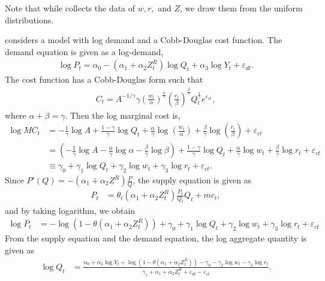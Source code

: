 \documentclass[11pt, a4paper]{article}
\begin{document}
Note that while \citet{hyde1995can} collects the data of $w, r,$ and $Z$, we draw them from the uniform distributions. 


\citet{hyde1995can} considers a model with log demand and a Cobb-Douglas cost function. 
The demand equation is given as a log-demand, 
\begin{align}
    \log P_{t} = \alpha_0 - (\alpha_1 + \alpha_2 Z^R_t) \log Q_t + \alpha_3 \log Y_t + \varepsilon_{dt}.
\end{align}
The cost function has a Cobb-Douglas form such that 
\begin{align}
    C_t = A^{-1/\gamma} \gamma \left(\frac{w_t}{\alpha}\right)^{\frac{\alpha}{\gamma}} \left(\frac{r_t}{\beta}\right)^{\frac{\beta}{\gamma}} Q_t^{\frac{1}{\gamma}}e^{\varepsilon_{ct}},
\end{align}
where $\alpha + \beta = \gamma$.
Then the log marginal cost is,
\begin{align}
    \log MC_t &= -\frac{1}{\gamma}\log A + \frac{1-\gamma}{\gamma}\log Q_t + \frac{\alpha}{\gamma} \log \left(\frac{w_t}{\alpha}\right) + \frac{\beta}{\gamma} \log \left(\frac{r_t}{\beta}\right) + \varepsilon_{ct}\nonumber\\
        & = \left( -\frac{1}{\gamma}\log A - \frac{\alpha}{\gamma}\log \alpha -  \frac{\beta}{\gamma}\log\beta    \right) + \frac{1-\gamma}{\gamma}\log Q_t + \frac{\alpha}{\gamma} \log w_t + \frac{\beta}{\gamma} \log r_t + \varepsilon_{ct}\nonumber \\
        &\equiv \gamma_0 + \gamma_1 \log Q_t +  \gamma_2 \log w_t + \gamma_3 \log r_t + \varepsilon_{ct}.
\end{align}
Since $P'(Q) = - (\alpha_1 + \alpha_2 Z^R) \frac{P}{Q} $, the supply equation is given as
\begin{align}
    P_t &= \theta_t (\alpha_1 + \alpha_2 Z^R_t) \frac{P_t}{Q_t} Q_t + mc_t,
\end{align}
and by taking logarithm, we obtain
\begin{align}
    \log P_t & = - \log(1 - \theta(\alpha_1 + \alpha_2 Z^R_t)) + \gamma_0 + \gamma_1 \log Q_t +  \gamma_2 \log w_t + \gamma_3 \log r_t + \varepsilon_{ct}
\end{align}
From the supply equation and the demand equation, the log aggregate quantity is given as 
\begin{align}
    \log Q_t &= \frac{ \alpha_0 + \alpha_3 \log Y_t + \log (1 - \theta (\alpha_1 + \alpha_2 Z^R_t)) - \gamma_0  -  \gamma_2 \log w_t - \gamma_3 \log r_t}{\gamma_1+ \alpha_1 + \alpha_2 Z^R_t + \varepsilon_{dt} - \varepsilon_{ct}}.
\end{align}
\end{document}
